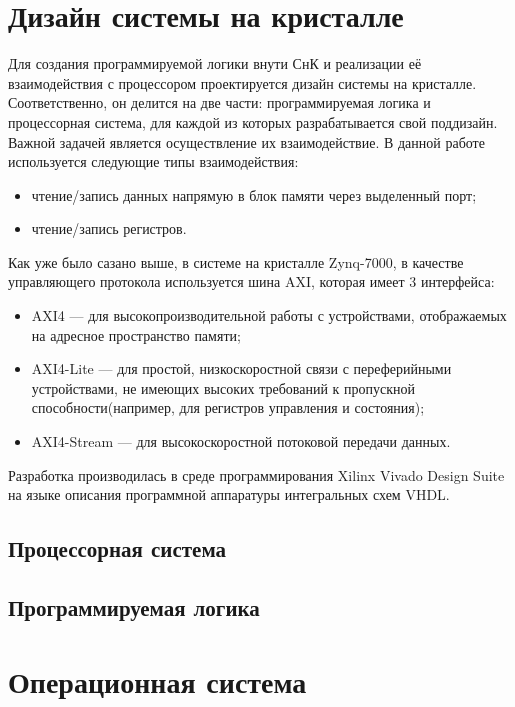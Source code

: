 \documentclass[a4paper, 14pt]{extarticle}
\begin{document}
\section{Дизайн системы на кристалле}
    Для создания программируемой логики внути СнК и реализации её взаимодействия с процессором проектируется дизайн системы на кристалле. Соответственно, он делится на две части: программируемая логика и процессорная система, для каждой из которых разрабатывается свой поддизайн. Важной задачей является осуществление их взаимодействие. В данной работе используется следующие типы взаимодействия:
    \begin{itemize}
        \item чтение/запись данных напрямую в блок памяти через выделенный порт;
        \item чтение/запись регистров.
    \end{itemize}\par
    Как уже было сазано выше, в системе на кристалле Zynq-7000, в качестве управляющего протокола используется шина AXI, которая имеет 3 интерфейса:
    \begin{itemize}
        \item AXI4 --- для высокопроизводительной работы с устройствами, отображаемых на адресное пространство памяти;
        \item AXI4-Lite --- для простой, низкоскоростной связи с переферийными устройствами, не имеющих высоких требований к пропускной способности(например, для регистров управления и состояния);
        \item AXI4-Stream --- для высокоскоростной потоковой передачи данных.
    \end{itemize}\par
    Разработка производилась в среде программирования Xilinx Vivado Design Suite на языке описания программной аппаратуры интегральных схем VHDL.
    \subsection{Процессорная система}
    
    \subsection{Программируемая логика}
    

\section{Операционная система}
\end{document}
